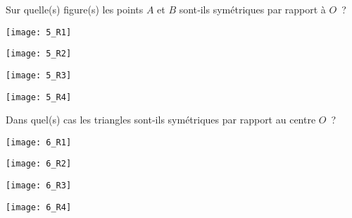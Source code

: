 \begin{QCM}
  \begin{GroupeQCM}
      \begin{exercice}
      Sur quelle(s) figure(s) les points $A$ et $B$ sont‑ils symétriques par rapport à $O$ ?
      \begin{ChoixQCM}{4}
      \item 
      
      \texttt{[image: 5\_R1]}
      \item 
      
      \texttt{[image: 5\_R2]}
      \item 
      
      \texttt{[image: 5\_R3]}
      \item 
      
      \texttt{[image: 5\_R4]}
      \end{ChoixQCM}
\begin{corrige}
   \end{corrige}
    \end{exercice}
    
    
    \begin{exercice}
      Dans quel(s) cas les triangles sont-ils symétriques par rapport au centre $O$ ?
      \begin{ChoixQCM}{4}
      \item 
      
      \texttt{[image: 6\_R1]}
      \item 
      
      \texttt{[image: 6\_R2]}
      \item 
      
      \texttt{[image: 6\_R3]}
      \item 
      
      \texttt{[image: 6\_R4]}
      \end{ChoixQCM}
\begin{corrige}
   \end{corrige}
    \end{exercice}
    \end{GroupeQCM}
\end{QCM}




  